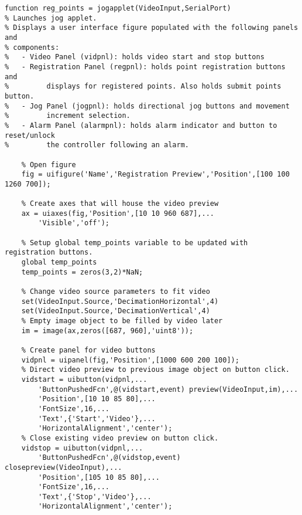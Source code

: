 \begin{lstlisting}
function reg_points = jogapplet(VideoInput,SerialPort)
% Launches jog applet.
% Displays a user interface figure populated with the following panels and
% components:
%   - Video Panel (vidpnl): holds video start and stop buttons
%   - Registration Panel (regpnl): holds point registration buttons and
%         displays for registered points. Also holds submit points button.
%   - Jog Panel (jogpnl): holds directional jog buttons and movement
%         increment selection.
%   - Alarm Panel (alarmpnl): holds alarm indicator and button to reset/unlock
%         the controller following an alarm.

    % Open figure
    fig = uifigure('Name','Registration Preview','Position',[100 100 1260 700]);
    
	% Create axes that will house the video preview
	ax = uiaxes(fig,'Position',[10 10 960 687],...
        'Visible','off');
    
	% Setup global temp_points variable to be updated with registration buttons.
    global temp_points
    temp_points = zeros(3,2)*NaN;
    
	% Change video source parameters to fit video
    set(VideoInput.Source,'DecimationHorizontal',4)
    set(VideoInput.Source,'DecimationVertical',4)
	% Empty image object to be filled by video later
    im = image(ax,zeros([687, 960],'uint8'));
    
	% Create panel for video buttons
    vidpnl = uipanel(fig,'Position',[1000 600 200 100]);
	% Direct video preview to previous image object on button click.
    vidstart = uibutton(vidpnl,...
        'ButtonPushedFcn',@(vidstart,event) preview(VideoInput,im),...
        'Position',[10 10 85 80],...
        'FontSize',16,...
        'Text',{'Start','Video'},...
        'HorizontalAlignment','center');
	% Close existing video preview on button click.
    vidstop = uibutton(vidpnl,...
        'ButtonPushedFcn',@(vidstop,event) closepreview(VideoInput),...
        'Position',[105 10 85 80],...
        'FontSize',16,...
        'Text',{'Stop','Video'},...
        'HorizontalAlignment','center');
    

\end{lstlisting}
